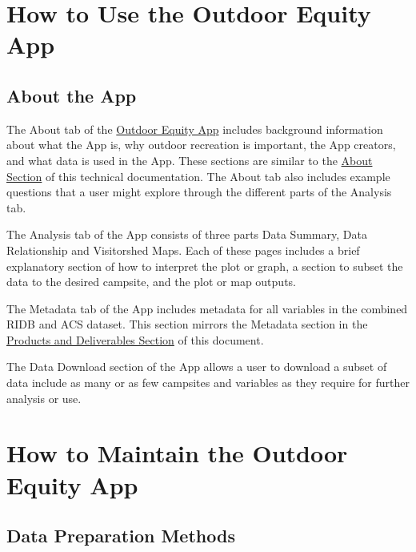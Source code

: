 \documentclass[
]{book}
\begin{document}
\hypertarget{how-to-use-the-outdoor-equity-app}{%
\section{How to Use the Outdoor Equity App}\label{how-to-use-the-outdoor-equity-app}}

\hypertarget{about-the-app}{%
\subsection{About the App}\label{about-the-app}}

The About tab of the \href{https://shinyapps.bren.ucsb.edu/oe_app/}{Outdoor Equity App} includes background information about what the App is, why outdoor recreation is important, the App creators, and what data is used in the App. These sections are similar to the \protect\hyperlink{about}{About Section} of this technical documentation. The About tab also includes example questions that a user might explore through the different parts of the Analysis tab.

The Analysis tab of the App consists of three parts Data Summary, Data Relationship and Visitorshed Maps. Each of these pages includes a brief explanatory section of how to interpret the plot or graph, a section to subset the data to the desired campsite, and the plot or map outputs.

The Metadata tab of the App includes metadata for all variables in the combined RIDB and ACS dataset. This section mirrors the Metadata section in the \protect\hyperlink{products-and-deliverables}{Products and Deliverables Section} of this document.

The Data Download section of the App allows a user to download a subset of data include as many or as few campsites and variables as they require for further analysis or use.

\hypertarget{how-to-maintain-the-outdoor-equity-app}{%
\section{How to Maintain the Outdoor Equity App}\label{how-to-maintain-the-outdoor-equity-app}}

\hypertarget{data-preparation-methods}{%
\subsection{Data Preparation Methods}\label{data-preparation-methods}}
\end{document}
